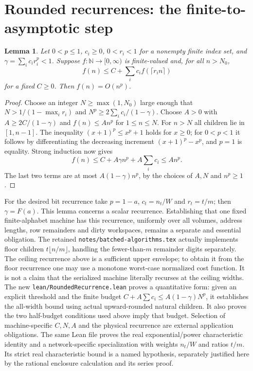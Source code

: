 \documentclass[11pt]{article}
\newtheorem{lemma}[theorem]{Lemma}
\begin{document}
\section{Rounded recurrences: the finite-to-asymptotic step}
\begin{lemma}\label{lem:rounded}
Let $0<p\le1$, $c_i\ge0$, $0<r_i<1$ for a nonempty finite index set,
and $\gamma=\sum_i c_i r_i^p<1$. Suppose $f:\mathbb N\to[0,\infty)$
is finite-valued and, for all $n>N_0$,
\[
 f(n)\le C+\sum_i c_i f(\lceil r_i n\rceil)
\]
for a fixed $C\ge0$. Then $f(n)=O(n^p)$.
\end{lemma}
\begin{proof}
Choose an integer $N\ge\max(1,N_0)$ large enough that
$N>1/(1-\max_i r_i)$ and
$N^p\ge2\sum_i c_i/(1-\gamma)$.
Choose $A>0$ with $A\ge2C/(1-\gamma)$ and
$f(n)\le An^p$ for $1\le n\le N$.
For $n>N$ all children lie in $[1,n-1]$.
The inequality $(x+1)^p\le x^p+1$ holds for $x\ge0$;
for $0<p<1$ it follows by differentiating the decreasing increment
$(x+1)^p-x^p$, and $p=1$ is equality.
Strong induction now gives
\[
 f(n)\le C+A\gamma n^p+A\sum_i c_i\le An^p.
\]
The last two terms are at most $A(1-\gamma)n^p$, by the choices of
$A,N$ and $n^p\ge1$.
\end{proof}
For the desired bit recurrence take $p=1-a$, $c_t=n_t/W$ and $r_t=t/m$;
then $\gamma=F(a)$. This lemma concerns a scalar recurrence. Establishing
that one fixed finite-alphabet machine has this recurrence, uniformly over
all volumes, address lengths, row remainders and dirty workspaces, remains a
separate and essential obligation.
The retained \texttt{notes/batched-algorithms.tex} actually implements floor
children $t\lfloor n/m\rfloor$, handling the fewer-than-$m$ remainder digits
separately. The ceiling recurrence above is a sufficient upper envelope;
to obtain it from the floor recurrence one may use a monotone worst-case
normalized cost function. It is not a claim that the serialized machine
literally recurses at the ceiling widths.
The new \texttt{lean/RoundedRecurrence.lean} proves a quantitative form:
given an explicit threshold and the finite budget
$C+A\sum c_i\le A(1-\gamma)N^p$, it establishes the all-width bound using
actual upward-rounded natural children. It also proves the two half-budget
conditions used above imply that budget. Selection of machine-specific
$C,N,A$ and the physical recurrence are external application obligations.
The same Lean file proves the real exponential/power characteristic identity
and a network-specific specialization with weights $n_t/W$ and ratios $t/m$.
Its strict real characteristic bound is a named hypothesis, separately
justified here by the rational enclosure calculation and its series proof.
\end{document}
